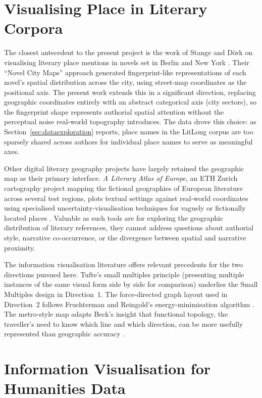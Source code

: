 \documentclass[logo,msc]{infthesis}
\begin{document}
\section{Visualising Place in Literary Corpora}
 
The closest antecedent to the present project is the work of Stange and D{\"o}rk on visualising literary place mentions in novels set in Berlin and New York \cite{stange2015}. Their ``Novel City Maps'' approach generated fingerprint-like representations of each novel's spatial distribution across the city, using street-map coordinates as the positional axis. The present work extends this in a significant direction, replacing geographic coordinates entirely with an abstract categorical axis (city sectors), so the fingerprint shape represents authorial spatial attention without the perceptual noise real-world topography introduces. The data drove this choice: as Section~\ref{sec:dataexploration} reports, place names in the LitLong corpus are too sparsely shared across authors for individual place names to serve as meaningful axes.
 
Other digital literary geography projects have largely retained the geographic map as their primary interface. \emph{A Literary Atlas of Europe}, an ETH Zurich cartography project mapping the fictional geographies of European literature across several test regions, plots textual settings against real-world coordinates using specialised uncertainty-visualisation techniques for vaguely or fictionally located places \cite{piatti2009}. Valuable as such tools are for exploring the geographic distribution of literary references, they cannot address questions about authorial style, narrative co-occurrence, or the divergence between spatial and narrative proximity.
 
The information visualisation literature offers relevant precedents for the two directions pursued here. Tufte's small multiples principle \cite{tufte1983} (presenting multiple instances of the same visual form side by side for comparison) underlies the Small Multiples design in Direction~1. The force-directed graph layout used in Direction~2 follows Fruchterman and Reingold's energy-minimisation algorithm \cite{fruchterman1991}. The metro-style map adapts Beck's insight that functional topology, the traveller's need to know which line and which direction, can be more usefully represented than geographic accuracy \cite{beck1933}.
 
\section{Information Visualisation for Humanities Data}
 
\end{document}
